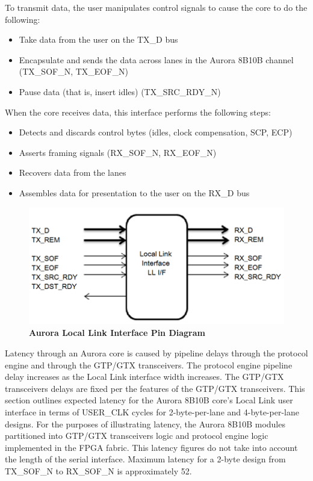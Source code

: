 To transmit data, the user manipulates control signals to cause the core to do the following:
\begin{itemize} 
	\item{Take data from the user on the TX\_D bus}
	\item{Encapsulate and sends the data across lanes in the Aurora 8B10B channel (TX\_SOF\_N, TX\_EOF\_N)}
	\item{Pause data (that is, insert idles) (TX\_SRC\_RDY\_N)}
\end{itemize}

When the core receives data, this interface performs the following steps:
\begin{itemize}
	\item{Detects and discards control bytes (idles, clock compensation, SCP, ECP)}
	\item{Asserts framing signals (RX\_SOF\_N, RX\_EOF\_N)}
	\item{Recovers data from the lanes}
	\item{Assembles data for presentation to the user on the RX\_D bus}
\end{itemize}

\begin{figure}[H]
  \centering
   \includegraphics[scale=1]{./figs/auroraLocalLink}
  \caption{\textbf{Aurora Local Link Interface Pin Diagram\cite{AuroraManual}}}
  \label{AuroraLocalLink}
\end{figure}

Latency through an Aurora core is caused by pipeline delays through the protocol engine and through the GTP/GTX transceivers. The protocol engine pipeline delay increases as the Local Link interface width increases. The GTP/GTX transceivers delays are fixed per the features of the GTP/GTX transceivers. This section outlines expected latency for the Aurora 8B10B core's Local Link user interface in terms of USER\_CLK cycles for 2-byte-per-lane and 4-byte-per-lane designs. For the purposes of illustrating latency, the Aurora 8B10B modules partitioned into GTP/GTX transceivers logic and protocol engine logic implemented in the FPGA fabric. This latency figures do not take into account the length of the serial interface. Maximum latency for a 2-byte design from TX\_SOF\_N to RX\_SOF\_N is approximately 52.\\

